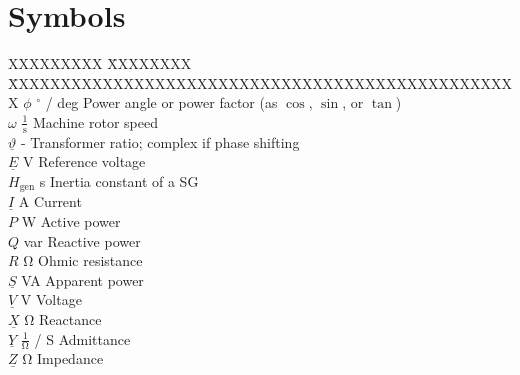 \chapter*{Symbols}
\label{chap:symbols}

\begin{tabbing}
    XXXXXXXXX \= XXXXXXXX \= XXXXXXXXXXXXXXXXXXXXXXXXXXXXXXXXXXXXXXXXXXXXXXXXX \kill
    $\phi$                  \> $^\circ$ / deg                   \> Power angle or power factor (as $\cos$, $\sin$, or $\tan$) \\
    $\omega$                \> $\mathrm{\frac{1}{s}}$           \> Machine rotor speed \\
    $\underline{\vartheta}$ \> -                                \> Transformer ratio; complex if phase shifting \\
    $\underline{E}$         \> V                                \> Reference voltage \\
    $H_\mathrm{gen}$        \> s                                \> Inertia constant of a \acf{SG} \\
    $\underline{I}$         \> A                                \> Current \\
    $P$                     \> W                                \> Active power\\
    $Q$                     \> var                              \> Reactive power \\
    $R$                     \> $\mathrm{\Omega}$                \> Ohmic resistance \\
    $\underline{S}$         \> VA                               \> Apparent power \\
    $\underline{V}$         \> V                                \> Voltage \\
    $\underline{X}$         \> $\mathrm{\Omega}$                \> Reactance \\
    $\underline{Y}$         \> $\mathrm{\frac{1}{\Omega}}$ / S  \> Admittance \\
    $\underline{Z}$         \> $\mathrm{\Omega}$                \> Impedance \\
\end{tabbing}

